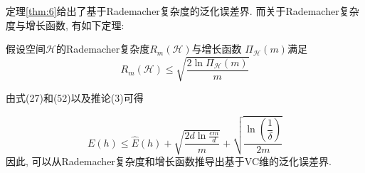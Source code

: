 定理\ref{thm:6}给出了基于Rademacher复杂度的泛化误差界. 而关于Rademacher复杂度与增长函数, 有如下定理: 

\begin{theorem}\label{thm:7}
假设空间$\mathcal{H}$的Rademacher复杂度$R_m\left(\mathcal{H}\right)$与增长函数 $\Pi _{\mathcal{H}}\left( m \right) $满足
\begin{equation}
R_m\left( \mathcal{H} \right) \le \sqrt{\frac{2\ln \Pi _{\mathcal{H}}\left( m \right)}{m}}
\end{equation}
\end{theorem}

由式\textrm{(27)}和\textrm{(52)}以及推论(3)可得

\begin{equation}
E\left( h \right) \le \hat{E}\left( h \right) +\sqrt{\frac{2d\ln \frac{em}{d}}{m}}+\sqrt{\frac{\ln \left( \dfrac{1}{\delta} \right)}{2m}}
\end{equation}
因此, 可以从Rademacher复杂度和增长函数推导出基于VC维的泛化误差界.


